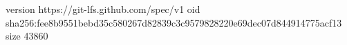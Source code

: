 version https://git-lfs.github.com/spec/v1
oid sha256:fee8b9551bebd35c580267d82839c3c9579828220e69dec07d844914775acf13
size 43860
